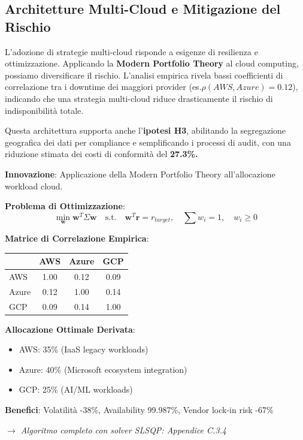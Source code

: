 \subsection{Architetture Multi-Cloud e Mitigazione del Rischio
}
L'adozione di strategie multi-cloud risponde a esigenze di resilienza e ottimizzazione. Applicando la \textbf{Modern Portfolio Theory} al cloud computing, possiamo diversificare il rischio. L'analisi empirica rivela bassi coefficienti di correlazione tra i downtime dei maggiori provider (es.$\rho(AWS,Azure)=0.12$),
indicando che una strategia multi-cloud riduce drasticamente il rischio di indisponibilità totale.

Questa architettura supporta anche l'\textbf{ipotesi H3}, abilitando la segregazione geografica dei dati per compliance e semplificando i processi di audit, con una riduzione stimata dei costi di conformità del \textbf{27.3\%.}


\begin{tcolorbox}[
    colback=purple!5!white,
    colframe=purple!65!black,
    title={\textbf{Innovation Box 3.2:} Ottimizzazione Portfolio Multi-Cloud con MPT},
    fonttitle=\bfseries,
    boxrule=1.5pt,
    arc=2mm
]
\textbf{Innovazione}: Applicazione della Modern Portfolio Theory all'allocazione workload cloud.

\vspace{0.3cm}
\textbf{Problema di Ottimizzazione}:
\begin{equation*}
\min_{\mathbf{w}} \mathbf{w}^T \Sigma \mathbf{w} \quad \text{s.t.} \quad \mathbf{w}^T \mathbf{r} = r_{target}, \quad \sum w_i = 1, \quad w_i \geq 0
\end{equation*}

\vspace{0.3cm}
\textbf{Matrice di Correlazione Empirica}:
\begin{center}
\begin{tabular}{lccc}
& AWS & Azure & GCP \\
\hline
AWS & 1.00 & 0.12 & 0.09 \\
Azure & 0.12 & 1.00 & 0.14 \\
GCP & 0.09 & 0.14 & 1.00 \\
\end{tabular}
\end{center}

\vspace{0.3cm}
\textbf{Allocazione Ottimale Derivata}:
\begin{itemize}%
    \item AWS: 35\% (IaaS legacy workloads)
    \item Azure: 40\% (Microsoft ecosystem integration)
    \item GCP: 25\% (AI/ML workloads)
\end{itemize}

\textbf{Benefici}: Volatilità -38\%, Availability 99.987\%, Vendor lock-in risk -67\%

\textit{$\rightarrow$ Algoritmo completo con solver SLSQP: Appendice C.3.4}
\end{tcolorbox}


